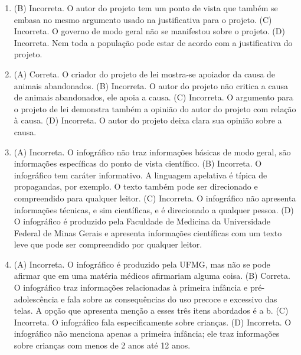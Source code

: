 \begin{enumerate}
\item (B)
  Incorreta. O autor do projeto tem um ponto de vista que também se
  embasa no mesmo argumento usado na justificativa para o projeto.
(C)
  Incorreta. O governo de modo geral não se manifestou sobre o projeto.
(D)
  Incorreta. Nem toda a população pode estar de acordo com a
  justificativa do projeto.

\item (A) Correta. O criador do projeto de lei mostra-se apoiador da causa de
animais abandonados.
(B) Incorreta. O autor do projeto não critica a causa de animais
abandonados, ele apoia a causa.
(C) Incorreta. O argumento para o projeto de lei demonstra também a
opinião do autor do projeto com relação à causa.
(D) Incorreta. O autor do projeto deixa clara sua opinião sobre a causa.

\item (A) Incorreta. O infográfico não traz informações básicas de modo geral,
são informações específicas do ponto de vista científico.
(B) Incorreta. O infográfico tem caráter informativo. A linguagem
apelativa é típica de propagandas, por exemplo. O texto também pode ser
direcionado e compreendido para qualquer leitor.
(C) Incorreta. O infográfico não apresenta informações técnicas, e sim
científicas, e é direcionado a qualquer pessoa.
(D) O infográfico é produzido pela Faculdade de Medicina da Universidade
Federal de Minas Gerais e apresenta informações científicas com um texto
leve que pode ser compreendido por qualquer leitor.

\item (A) Incorreta. O infográfico é produzido pela UFMG, mas não se pode
afirmar que em uma matéria médicos afirmariam alguma coisa.
(B) Correta. O infográfico traz informações relacionadas à primeira
infância e pré-adolescência e fala sobre as consequências do uso precoce
e excessivo das telas. A opção que apresenta menção a esses três itens
abordados é a b.
(C) Incorreta. O infográfico fala especificamente sobre crianças.
(D) Incorreta. O infográfico não menciona apenas a primeira infância; ele
traz informações sobre crianças com menos de 2 anos até 12 anos.
\end{enumerate}


